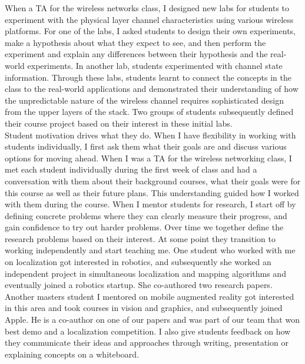 \documentclass[10pt]{article}
\begin{document}
When a TA for the wireless networks class, I designed new labs for students to experiment with the physical layer channel characteristics using various wireless platforms. 
For one of the labs, I asked students to design their own experiments, make a hypothesis about what they expect to see, and then perform the experiment and explain any differences between their hypothesis and the real-world experiments. In another lab, students experimented with channel state information. Through these labs, students learnt to connect the concepts in the class to the real-world applications and demonstrated their understanding of how the unpredictable nature of the wireless channel requires sophisticated design from the upper layers of the stack. Two groups of students subsequently defined their course project based on their interest in these initial labs. \\ 

Student motivation drives what they do. When I have flexibility in working with students individually, I first ask them what their goals are and discuss various options for moving ahead. When I was a TA for the wireless networking class, I met each student individually during the first week of class and had a conversation with them about their background courses, what their goals were for this course as well as their future plans. This understanding guided how I worked with them during the course. When I mentor students for research, I start off by defining concrete problems where they can clearly measure their progress, and gain confidence to try out harder problems. Over time we together define the research problems based on their interest. At some point they transition to working independently and start teaching me. One student who worked with me on localization got interested in robotics, and subsequently she worked an independent project in simultaneous localization and mapping algorithms and eventually joined a robotics startup. She co-authored two research papers. Another masters student I mentored on mobile augmented reality got interested in this area and took courses in vision and graphics, and subsequently joined Apple. He is a co-author on one of our papers and was part of our team that won best demo and a localization competition. I also give students feedback on how they communicate their ideas and approaches through writing, presentation or explaining concepts on a whiteboard.
\end{document}
